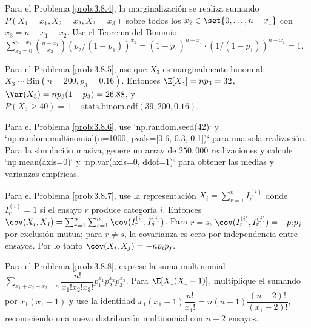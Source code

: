 \begin{sugerencia}
	\label{sug:3.8.4}
	Para el Problema \ref{prob:3.8.4}, la marginalización se realiza sumando $P(X_{1} = x_{1}, X_{2} = x_{2}, X_{3} = x_{3})$ sobre todos los $x_{2} \in \set{0, \dots, n - x_{1}}$ con $x_{3} = n - x_{1} - x_{2}$. Use el Teorema del Binomio: $\sum_{x_{2}=0}^{n-x_{1}} \binom{n - x_{1}}{x_{2}} (p_{2}/(1-p_{1}))^{x_{2}} = (1-p_{1})^{n-x_{1}} \cdot (1/(1-p_{1}))^{n-x_{1}} = 1$.
\end{sugerencia}

\begin{sugerencia}
	\label{sug:3.8.5}
	Para el Problema \ref{prob:3.8.5}, use que $X_{3}$ es marginalmente binomial: $X_{3} \sim \text{Bin}(n = 200, p_{3} = 0.16)$. Entonces $\E[X_{3}] = np_{3} = 32$, $\Var(X_{3}) = np_{3}(1-p_{3}) = 26.88$, y $P(X_{3} \ge 40) = 1 - \text{stats.binom.cdf}(39, 200, 0.16)$.
\end{sugerencia}

\begin{sugerencia}
	\label{sug:3.8.6}
	Para el Problema \ref{prob:3.8.6}, use `np.random.seed(42)` y `np.random.multinomial(n=1000, pvals=[0.6, 0.3, 0.1])` para una sola realización. Para la simulación masiva, genere un array de $250{,}000$ realizaciones y calcule `np.mean(axis=0)` y `np.var(axis=0, ddof=1)` para obtener las medias y varianzas empíricas.
\end{sugerencia}

\begin{sugerencia}
	\label{sug:3.8.7}
	Para el Problema \ref{prob:3.8.7}, use la representación $X_{i} = \sum_{r=1}^{n} I_{r}^{(i)}$ donde $I_{r}^{(i)} = 1$ si el ensayo $r$ produce categoría $i$. Entonces $\cov(X_{i}, X_{j}) = \sum_{r=1}^{n} \sum_{s=1}^{n} \cov(I_{r}^{(i)}, I_{s}^{(j)})$. Para $r = s$, $\cov(I_{r}^{(i)}, I_{r}^{(j)}) = -p_{i} p_{j}$ por exclusión mutua; para $r \neq s$, la covarianza es cero por independencia entre ensayos. Por lo tanto $\cov(X_{i}, X_{j}) = -n p_{i} p_{j}$.
\end{sugerencia}

\begin{sugerencia}
	\label{sug:3.8.8}
	Para el Problema \ref{prob:3.8.8}, exprese la suma multinomial $\sum_{x_{1}+x_{2}+x_{3}=n} \dfrac{n!}{x_{1}! x_{2}! x_{3}!} p_{1}^{x_{1}} p_{2}^{x_{2}} p_{3}^{x_{3}}$. Para $\E[X_{1}(X_{1}-1)]$, multiplique el sumando por $x_{1}(x_{1}-1)$ y use la identidad $x_{1}(x_{1}-1) \dfrac{n!}{x_{1}!} = n(n-1) \dfrac{(n-2)!}{(x_{1}-2)!}$, reconociendo una nueva distribución multinomial con $n-2$ ensayos.
\end{sugerencia}

